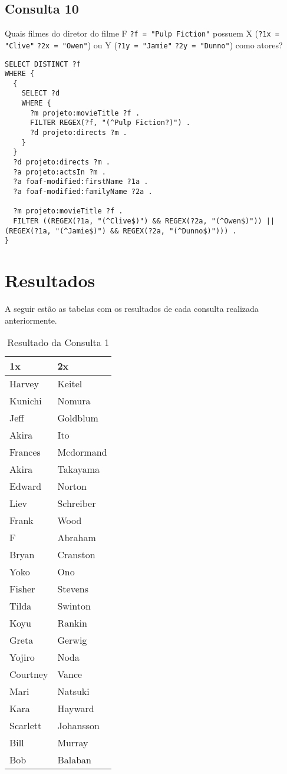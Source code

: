 \documentclass{article}
\newcommand{\code}[1]{\lstinline[mathescape=true]{#1}}
\begin{document}
\subsection{Consulta 10}
Quais filmes do diretor do filme F \code{?f = "Pulp Fiction"} possuem X (\code{?1x = "Clive"} \code{?2x = "Owen"}) ou Y (\code{?1y = "Jamie"} \code{?2y = "Dunno"}) como atores?
\begin{lstlisting}[basicstyle=\ttfamily,frame=single]
SELECT DISTINCT ?f
WHERE {
  {
    SELECT ?d
    WHERE {
      ?m projeto:movieTitle ?f .
      FILTER REGEX(?f, "(^Pulp Fiction?)") .
      ?d projeto:directs ?m .
    }
  }
  ?d projeto:directs ?m .
  ?a projeto:actsIn ?m .
  ?a foaf-modified:firstName ?1a .
  ?a foaf-modified:familyName ?2a .

  ?m projeto:movieTitle ?f .
  FILTER ((REGEX(?1a, "(^Clive$)") && REGEX(?2a, "(^Owen$)")) || (REGEX(?1a, "(^Jamie$)") && REGEX(?2a, "(^Dunno$)"))) .
}
\end{lstlisting}
\section{Resultados}

A seguir estão as tabelas com os resultados de cada consulta realizada anteriormente.

\begin{table}[htbp]
\begin{center}
\begin{tabular}{ll}

\textbf{1x} & \textbf{2x} \\ 
\midrule
Harvey & Keitel \\ 
Kunichi & Nomura \\ 
Jeff & Goldblum \\ 
Akira & Ito \\ 
Frances & Mcdormand \\ 
Akira & Takayama \\ 
Edward & Norton \\ 
Liev & Schreiber \\ 
Frank & Wood \\ 
F & Abraham \\ 
Bryan & Cranston \\ 
Yoko & Ono \\ 
Fisher & Stevens \\ 
Tilda & Swinton \\ 
Koyu & Rankin \\ 
Greta & Gerwig \\ 
Yojiro & Noda \\ 
Courtney & Vance \\ 
Mari & Natsuki \\ 
Kara & Hayward \\ 
Scarlett & Johansson \\ 
Bill & Murray \\ 
Bob & Balaban \\ 
\end{tabular}
\end{center}
\caption{Resultado da Consulta 1}
\end{table}
\end{document}
